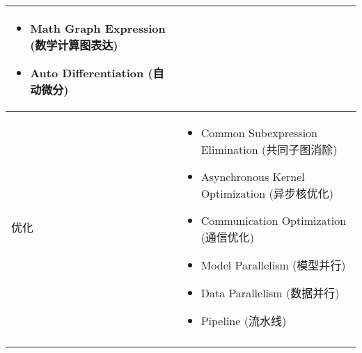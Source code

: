 \begin{table}[!htb]
\begin{tabu}{X[l, -1]|X[l]}
\begin{minipage}[t]{\linewidth}
\begin{itemize}
				\item Math Graph Expression (数学计算图表达)
				\item Auto Differentiation (自动微分)
			\end{itemize}
		\end{minipage}\\\hline
		优化 &
		\begin{minipage}[t]{\linewidth}
			\begin{itemize}
				\item Common Subexpression Elimination (共同子图消除)
				\item Asynchronous Kernel Optimization (异步核优化)
				\item Communication Optimization (通信优化)
				\item Model Parallelism (模型并行)
				\item Data Parallelism (数据并行)
				\item Pipeline (流水线)
			\end{itemize}
		\end{minipage}\\
		\tabucline[1pt]{-}
	\end{tabu}
\end{table}
